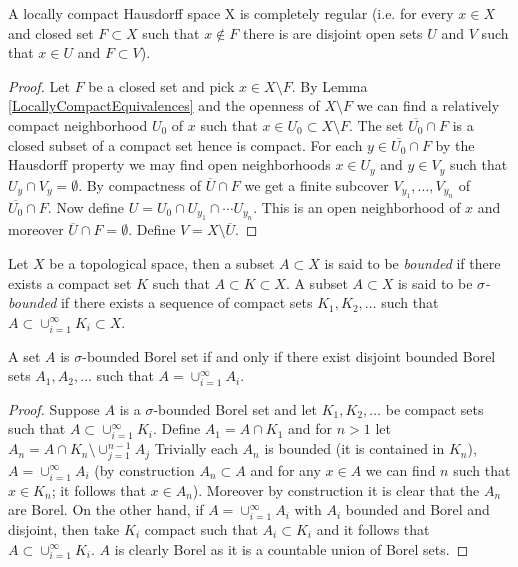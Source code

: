\begin{prop}\label{CompleteRegularityLCH}A locally compact Hausdorff space X is completely regular
  (i.e. for every $x \in X$ and closed set $F \subset X$ such that $x
  \notin F$ there is are disjoint open sets $U$ and $V$ such that $x
  \in U$ and $F \subset V$).
\end{prop}
\begin{proof}
Let $F$ be a closed set and pick $x \in X \setminus F$.  By Lemma
\ref{LocallyCompactEquivalences} and the openness of $X \setminus F$
we can find a relatively compact neighborhood $U_0$ of $x$ such that $x
\in U_0 \subset X \setminus F$.  The set $\overline{U_0} \cap F$ is a closed subset of a compact
set hence is compact.  For each $y \in \overline{U_0} \cap F$ by the
Hausdorff property we may find open neighborhoods $x \in U_y$ and $y
\in V_y$ such that $U_y \cap V_y = \emptyset$.  By compactness of
$\overline{U} \cap F$ we get a finite subcover $V_{y_1}, \dotsc,
V_{y_n}$ of $\overline{U_0} \cap F$.  Now define $U = U_0 \cap U_{y_1}
\cap \dotsb U_{y_n}$.  This is an open neighborhood of $x$ and
moreover $\overline{U} \cap F = \emptyset$.  Define $V = X \setminus \overline{U}$.
\end{proof}

\begin{defn}Let $X$ be a topological space, then a subset $A \subset
  X$ is said to be \emph{bounded} if there exists a compact set $K$
  such that 
  $A \subset K \subset X$.  A subset $A \subset
  X$ is said to be \emph{$\sigma$-bounded} if there exists a sequence
  of compact sets $K_1, K_2, \dotsc$ such that
$A \subset  \cup_{i=1}^\infty K_i \subset X$.
\end{defn}

\begin{prop}\label{SigmaBoundedEquivalence}A set $A$ is $\sigma$-bounded Borel set if and only if
  there exist disjoint bounded Borel sets $A_1, A_2, \dotsc$ such that $A =
  \cup_{i=1}^\infty A_i$.
\end{prop}
\begin{proof}
Suppose $A$ is a $\sigma$-bounded Borel set and let $K_1, K_2, \dotsc$
be compact sets such that $A \subset \cup_{i=1}^\infty K_i$.  Define
$A_1= A \cap K_1$ and for $n>1$ let $A_n = A \cap K_n \setminus
\cup_{j=1}^{n-1} A_j$  Trivially each $A_n$ is bounded (it is contained in
$K_n$), $A = \cup_{i=1}^\infty A_i$ (by construction $A_n \subset A$
and for any $x \in A$ we can find $n$ such that $x \in K_n$; it
follows that $x \in A_n$).  Moreover by construction it is clear that
the $A_n$ are Borel.  On the other hand, if $A =
\cup_{i=1}^\infty A_i$ with $A_i$ bounded and Borel and disjoint, then take $K_i$ compact
such that $A_i \subset K_i$ and it follows that $A \subset
\cup_{i=1}^\infty K_i$.  $A$ is clearly Borel as it is a countable
union of Borel sets.
\end{proof}

